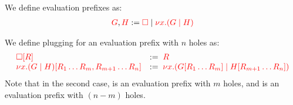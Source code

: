 \begin{definition}\label{def:cp-evaluation-prefixes}
  We define evaluation prefixes as:
  \begin{align*}
    \textcolor{red}{G}, \textcolor{red}{H} := \textcolor{red}{\Box} \mid \textcolor{red}{\nu x.(G \mid H)}
  \end{align*}
\end{definition}
\begin{definition}[Plugging]\label{def:cp-evaluation-prefix-plugging}
  We define plugging for an evaluation prefix with $n$ holes as:
  \[
    \begin{array}{ll}
      \textcolor{red}{{\Box}[{R}]} & := \; \textcolor{red}{R} \\
      \textcolor{red}{{\nu x.(G \mid H)}[{R_1 \dots R_m, R_{m+1} \dots R_{n}}]}
                            & := \; \textcolor{red}{\nu x.({G}[{R_1 \dots R_m}] \mid {H}[{R_{m+1} \dots R_n}])}
    \end{array}
  \]
  Note that in the second case,  is an evaluation prefix with $m$ holes,
  and  is an evaluation prefix with $(n-m)$ holes.
\end{definition}
